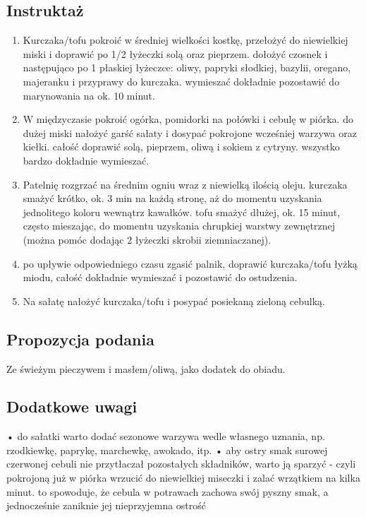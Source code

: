 \vspace{0.5cm}

\subsection*{Instruktaż}
\begin{enumerate}
    \item Kurczaka/tofu pokroić w średniej wielkości kostkę, przełożyć do niewielkiej miski i doprawić po 1/2 łyżeczki solą oraz pieprzem. dołożyć czosnek i następująco po 1 płaskiej łyżeczce: oliwy, papryki słodkiej, bazylii, oregano, majeranku i przyprawy do kurczaka. wymieszać dokładnie pozostawić do marynowania na ok. 10 minut.
    \item W międzyczasie pokroić ogórka, pomidorki na połówki i cebulę w piórka. do dużej miski nałożyć garść sałaty i dosypać pokrojone wcześniej warzywa oraz kiełki. całość doprawić solą, pieprzem, oliwą i sokiem z cytryny. wszystko bardzo dokładnie wymieszać.
    \item Patelnię rozgrzać na średnim ogniu wraz z niewielką ilością oleju. kurczaka smażyć krótko, ok. 3 min na każdą stronę, aż do momentu uzyskania jednolitego koloru wewnątrz kawałków. tofu smażyć dłużej, ok. 15 minut, często mieszając, do momentu uzyskania chrupkiej warstwy zewnętrznej (można pomóc dodając 2 łyżeczki skrobii ziemniaczanej).
    \item po upływie odpowiedniego czasu zgasić palnik, doprawić kurczaka/tofu łyżką miodu, całość dokładnie wymieszać i pozostawić do ostudzenia.
    \item Na sałatę nałożyć kurczaka/tofu i posypać posiekaną zieloną cebulką.
\end{enumerate}

\vspace{0.5cm}

\small
\subsection*{Propozycja podania}
Ze świeżym pieczywem i masłem/oliwą, jako dodatek do obiadu.

\vspace{0.3cm}

\subsection*{Dodatkowe uwagi}
• do sałatki warto dodać sezonowe warzywa wedle własnego uznania, np. rzodkiewkę, paprykę, marchewkę, awokado, itp.
 • aby ostry smak surowej czerwonej cebuli nie przytłaczał pozostałych składników, warto ją sparzyć - czyli pokrojoną już w piórka wrzucić do niewielkiej miseczki i zalać wrzątkiem na kilka minut. to spowoduje, że cebula w potrawach zachowa swój pyszny smak, a jednocześnie zaniknie jej nieprzyjemna ostrość

\newpage
